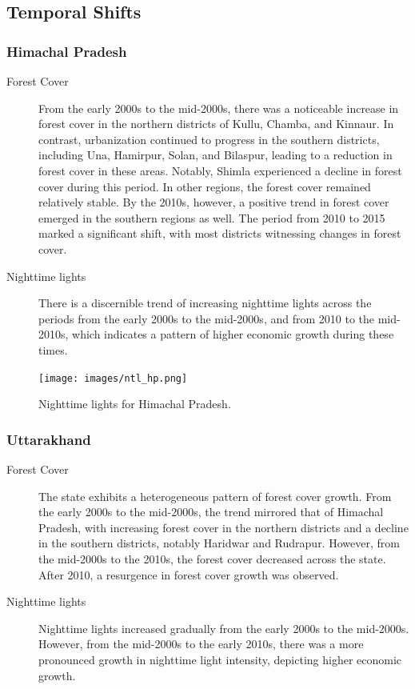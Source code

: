 \documentclass{article}
\begin{document}
\subsection{Temporal Shifts}

\subsubsection*{Himachal Pradesh}

\begin{description}
    \item[Forest Cover] From the early 2000s to the mid-2000s, there was a noticeable increase in forest cover in the northern districts of Kullu, Chamba, and Kinnaur. In contrast, urbanization continued to progress in the southern districts, including Una, Hamirpur, Solan, and Bilaspur, leading to a reduction in forest cover in these areas. Notably, Shimla experienced a decline in forest cover during this period. In other regions, the forest cover remained relatively stable. By the 2010s, however, a positive trend in forest cover emerged in the southern regions as well. The period from 2010 to 2015 marked a significant shift, with most districts witnessing changes in forest cover.
    \item[Nighttime lights] There is a discernible trend of increasing nighttime lights across the periods from the early 2000s to the mid-2000s, and from 2010 to the mid-2010s, which indicates a pattern of higher economic growth during these times.

\end{description}

\begin{figure}[h]
    \centering
    \texttt{[image: images/ntl\_hp.png]}
    \caption{Nighttime lights for Himachal Pradesh.}
\end{figure}


\subsubsection*{Uttarakhand}

\begin{description}
    \item[Forest Cover] The state exhibits a heterogeneous pattern of forest cover growth. From the early 2000s to the mid-2000s, the trend mirrored that of Himachal Pradesh, with increasing forest cover in the northern districts and a decline in the southern districts, notably Haridwar and Rudrapur. However, from the mid-2000s to the 2010s, the forest cover decreased across the state. After 2010, a resurgence in forest cover growth was observed.
    \item[Nighttime lights] Nighttime lights increased gradually from the early 2000s to the mid-2000s. However, from the mid-2000s to the early 2010s, there was a more pronounced growth in nighttime light intensity, depicting higher economic growth.

\end{description}
\end{document}
